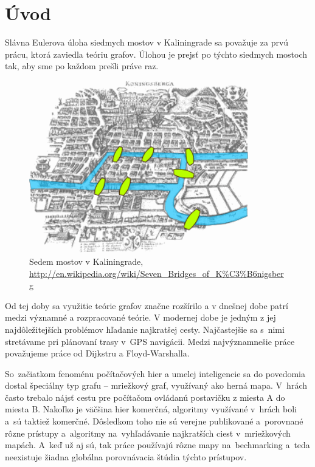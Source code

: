 \chapter*{Úvod}

Slávna Eulerova úloha siedmych mostov v Kaliningrade \cite{euler41} sa považuje za prvú prácu, 
ktorá zaviedla teóriu grafov.
Úlohou je prejsť po týchto siedmych mostoch tak, aby sme po každom prešli práve raz.


\begin{figure}[h]
\centering
\includegraphics[height=7.5cm]{./img/Konigsberg_bridges.png}
\caption{Sedem mostov v Kaliningrade, \url{http://en.wikipedia.org/wiki/Seven_Bridges_of_K\%C3\%B6nigsberg}}
\label{fig:konigsberg_bridges}
\end{figure}


 
Od tej doby sa využitie teórie grafov značne
rozšírilo a v dnešnej dobe patrí medzi významné
a rozpracované teórie. V modernej dobe je jedným z jej 
najdôležitejších problémov hľadanie najkratšej cesty. Najčastejšie sa s~nimi stretávame pri plánovaní trasy v~GPS navigácii.
Medzi najvýznamnešie práce považujeme práce od Dijkstru \cite{dijkstra59} a Floyd-Warshalla.

So~začiatkom fenoménu počítačových hier 
a umelej inteligencie sa do povedomia dostal špeciálny typ grafu --
mriežkový graf, využívaný ako herná mapa.
V~hrách často trebalo nájsť cestu pre počítačom
ovládanú postavičku z miesta A do miesta B.
Nakoľko je väčšina hier komerčná, algoritmy
využívané v~hrách boli a~sú taktiež komerčné.
Dôsledkom toho nie sú verejne publikované a~porovnané rôzne prístupy a~algoritmy
na~vyhľadávanie najkratších ciest v~mriežkových mapách. A~keď už aj sú, tak práce používajú rôzne mapy
na~bechmarking a~teda neexistuje žiadna globálna porovnávacia štúdia týchto prístupov.

